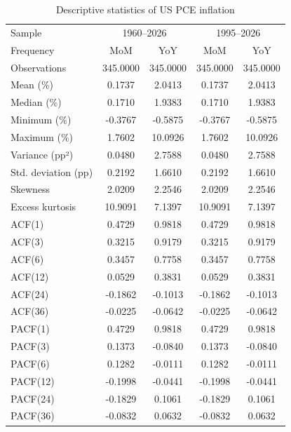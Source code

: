 \begin{table}
\caption{Descriptive statistics of US PCE inflation}
\label{tab:inflation_descriptive}
\begin{tabular}{lcccc}
\toprule
Sample & \multicolumn{2}{c}{1960–2026} & \multicolumn{2}{c}{1995–2026} \\
Frequency & MoM & YoY & MoM & YoY \\
\midrule
Observations & 345.0000 & 345.0000 & 345.0000 & 345.0000 \\
Mean (\%) & 0.1737 & 2.0413 & 0.1737 & 2.0413 \\
Median (\%) & 0.1710 & 1.9383 & 0.1710 & 1.9383 \\
Minimum (\%) & -0.3767 & -0.5875 & -0.3767 & -0.5875 \\
Maximum (\%) & 1.7602 & 10.0926 & 1.7602 & 10.0926 \\
Variance (pp²) & 0.0480 & 2.7588 & 0.0480 & 2.7588 \\
Std. deviation (pp) & 0.2192 & 1.6610 & 0.2192 & 1.6610 \\
Skewness & 2.0209 & 2.2546 & 2.0209 & 2.2546 \\
Excess kurtosis & 10.9091 & 7.1397 & 10.9091 & 7.1397 \\
ACF(1) & 0.4729 & 0.9818 & 0.4729 & 0.9818 \\
ACF(3) & 0.3215 & 0.9179 & 0.3215 & 0.9179 \\
ACF(6) & 0.3457 & 0.7758 & 0.3457 & 0.7758 \\
ACF(12) & 0.0529 & 0.3831 & 0.0529 & 0.3831 \\
ACF(24) & -0.1862 & -0.1013 & -0.1862 & -0.1013 \\
ACF(36) & -0.0225 & -0.0642 & -0.0225 & -0.0642 \\
PACF(1) & 0.4729 & 0.9818 & 0.4729 & 0.9818 \\
PACF(3) & 0.1373 & -0.0840 & 0.1373 & -0.0840 \\
PACF(6) & 0.1282 & -0.0111 & 0.1282 & -0.0111 \\
PACF(12) & -0.1998 & -0.0441 & -0.1998 & -0.0441 \\
PACF(24) & -0.1829 & 0.1061 & -0.1829 & 0.1061 \\
PACF(36) & -0.0832 & 0.0632 & -0.0832 & 0.0632 \\
\bottomrule
\end{tabular}
\end{table}
